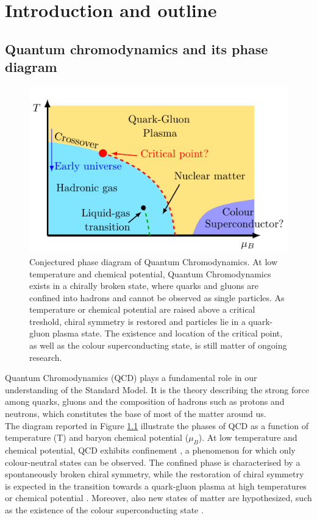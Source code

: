 \chapter{Introduction and outline}
\label{chap:introduction}
\section{Quantum chromodynamics and its phase diagram}
\begin{figure}[h]
    \centering 
    \includegraphics[scale=1.3]{figures/phase_diagram.pdf}
    \caption[The phase diagram of QCD]{Conjectured phase diagram of Quantum Chromodynamics. At low temperature and chemical potential, Quantum Chromodynamics exists in a chirally broken state, where quarks and gluons are confined into hadrons and cannot be observed as single particles. As temperature or chemical potential are raised above a critical treshold, chiral symmetry is restored and particles lie in a quark-gluon plasma state. The existence and location of the critical point, as well as the colour superconducting state, is still matter of ongoing research.}
    \label{fig:QCD_phase_diagram}
\end{figure}
\noindent Quantum Chromodynamics (QCD) plays a fundamental role in our understanding of the Standard Model. It is the theory describing the strong force among quarks, gluons and the composition of hadrons such as protons and neutrons, which constitutes the base of most of the matter around us. \\
The diagram reported in Figure \ref{fig:QCD_phase_diagram} illustrate the phases of QCD as a function of temperature (T) and baryon chemical potential ($\mu_B$).
At low temperature and chemical potential, QCD exhibits confinement \cite{confinement_wilson,confin}, a phenomenon for which only colour-neutral states can be observed. The confined phase is characterised by a spontaneously broken chiral symmetry, while the restoration of chiral symmetry is expected in the transition towards a quark-gluon plasma at high temperatures or chemical potential \cite{Masayuki1989,Stephanov_1998,Berges_1999,doi:10.1142/S0217751X92001757}. Moreover, also new states of matter are hypothesized, such as the existence of the colour superconducting state \cite{colorsuper1,colorsuper2,colorsuper3}. \\
